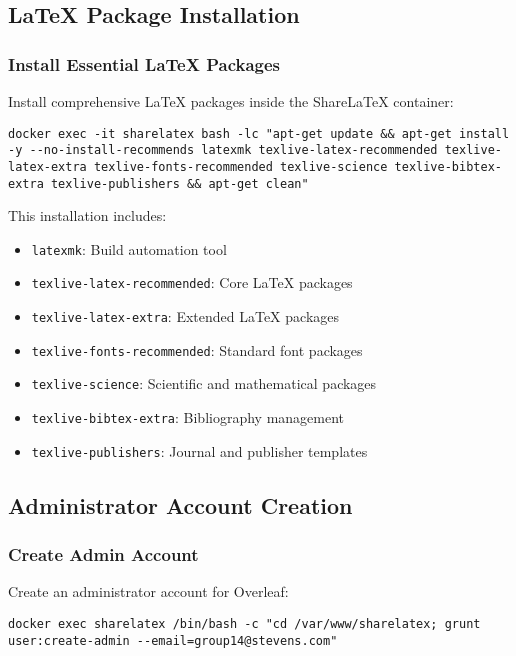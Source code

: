 \subsection{LaTeX Package Installation}

\subsubsection{Install Essential LaTeX Packages}

Install comprehensive LaTeX packages inside the ShareLaTeX container:

\begin{verbatim}
docker exec -it sharelatex bash -lc "apt-get update && apt-get install -y --no-install-recommends latexmk texlive-latex-recommended texlive-latex-extra texlive-fonts-recommended texlive-science texlive-bibtex-extra texlive-publishers && apt-get clean"
\end{verbatim}

This installation includes:
\begin{itemize}
    \item \texttt{latexmk}: Build automation tool
    \item \texttt{texlive-latex-recommended}: Core LaTeX packages
    \item \texttt{texlive-latex-extra}: Extended LaTeX packages
    \item \texttt{texlive-fonts-recommended}: Standard font packages
    \item \texttt{texlive-science}: Scientific and mathematical packages
    \item \texttt{texlive-bibtex-extra}: Bibliography management
    \item \texttt{texlive-publishers}: Journal and publisher templates
\end{itemize}

\subsection{Administrator Account Creation}

\subsubsection{Create Admin Account}

Create an administrator account for Overleaf:

\begin{verbatim}
docker exec sharelatex /bin/bash -c "cd /var/www/sharelatex; grunt user:create-admin --email=group14@stevens.com"
\end{verbatim}

